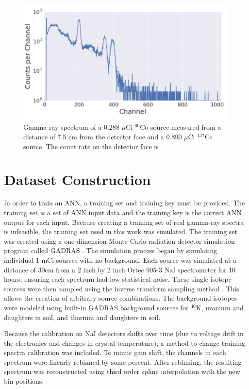 \documentclass[thesis,tocnosub,noragright,centerchapter,12pt,fullpage]{uiucecethesis09}
\begin{document}
\begin{figure}[H]
    \centering
    \includegraphics[width=0.5\linewidth]{images/CoCs_mix}
    \caption{Gamma-ray spectrum of a 0.288 $\mu$Ci $^{60}$Co source measured from a distance of 7.5 cm from the detector face and a 0.890 $\mu$Ci $^{137}$Cs source. The count rate on the detector face is  }
    \label{fig:top_five}
\end{figure}


\section{Dataset Construction}

In order to train an ANN, a training set and training key must be provided. The training set is a set of ANN input data and the training key is the correct ANN output for each input. Because creating a training set of real gamma-ray spectra is infeasible, the training set used in this work was simulated. The training set was created using a one-dimension Monte Carlo radiation detector simulation program called GADRAS \cite{mitchell2014}. The simulation process began by simulating individual 1 mCi sources with no background. Each source was simulated at a distance of 30cm from a 2 inch by 2 inch Ortec 905-3 NaI spectrometer for 10 hours, ensuring each spectrum had low statistical noise. These single isotope sources were then sampled using the inverse transform sampling method \cite{Devroyne}. This allows the creation of arbitrary source combinations. The background isotopes were modeled using built-in GADRAS background sources for $^{40}$K, uranium and daughters in soil, and thorium and daughters in soil.

Because the calibration on NaI detectors shifts over time (due to voltage drift in the electronics and changes in crystal temperature), a method to change training spectra calibration was included. To mimic gain shift, the channels in each spectrum were linearly rebinned by some percent. After rebinning, the resulting spectrum was reconstructed using third order spline interpolation with the new bin positions.
\end{document}
